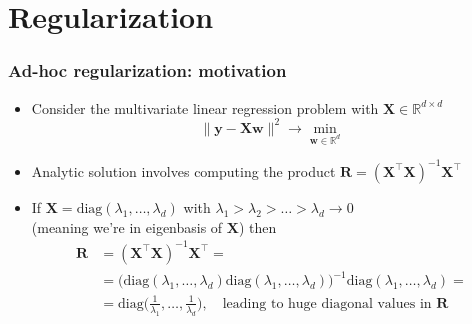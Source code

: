 \documentclass[usenames,dvipsnames,aspectratio=169]{beamer}
\def\RR{\mathbb{R}}
\begin{document}












\section{Regularization}




\begin{frame}
\frametitle{Ad-hoc regularization: motivation}

\begin{itemize}
  \item Consider the multivariate linear regression problem
  with $\bm{X} \in \RR^{d \times d}$
  \[
    \lVert \bm{y} - \bm{X} \mathbf{w}  \rVert^2 \to 
    \min_{\mathbf{w} \in \mathbb{R}^d}
  \]

  \pause
  \item Analytic solution involves 
  computing the
  product $\bm{R} =
  ( \bm{X}^{\intercal} \bm{X} )^{-1} \bm{X}^{\intercal}$

  \pause
  \item If $\bm{X} = \mbox{diag}(\lambda_1, \ldots, \lambda_d)$
    with $\lambda_1 > \lambda_2 > \ldots > \lambda_d \to 0$\\
    (meaning we're in eigenbasis of $\bm{X}$) then
  \begin{align*}
    \bm{R} &= ( \bm{X}^{\intercal} \bm{X} )^{-1} \bm{X}^{\intercal} = \\
    &= 
    \big(\mbox{diag}(\lambda_1, \ldots, \lambda_d)
    \mbox{diag}(\lambda_1, \ldots, \lambda_d)\big)^{-1}
    \mbox{diag}(\lambda_1, \ldots, \lambda_d) = \\
    &= \mbox{diag}\Big(\frac {1} {\lambda_1}, 
      \ldots, \frac {1} {\lambda_d}\Big),
      \quad
      \mbox{leading to huge diagonal values in $\bm{R}$ }
  \end{align*}

\end{itemize}

\end{frame}
\end{document}
